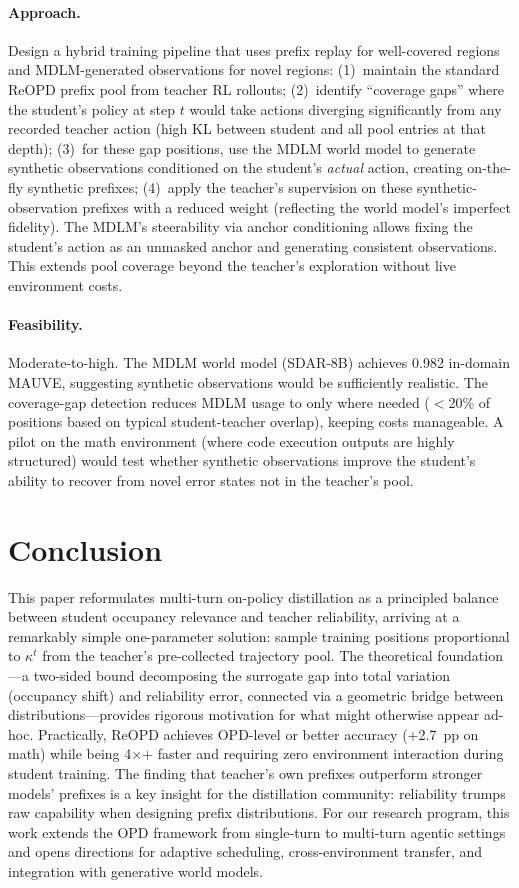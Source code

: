 \documentclass[11pt,a4paper]{article}
\begin{document}
\paragraph{Approach.}
Design a hybrid training pipeline that uses prefix replay for well-covered regions and MDLM-generated observations for novel regions: (1)~maintain the standard ReOPD prefix pool from teacher RL rollouts; (2)~identify ``coverage gaps'' where the student's policy at step $t$ would take actions diverging significantly from any recorded teacher action (high KL between student and all pool entries at that depth); (3)~for these gap positions, use the MDLM world model to generate synthetic observations conditioned on the student's \emph{actual} action, creating on-the-fly synthetic prefixes; (4)~apply the teacher's supervision on these synthetic-observation prefixes with a reduced weight (reflecting the world model's imperfect fidelity). The MDLM's steerability via anchor conditioning allows fixing the student's action as an unmasked anchor and generating consistent observations. This extends pool coverage beyond the teacher's exploration without live environment costs.

\paragraph{Feasibility.}
Moderate-to-high. The MDLM world model (SDAR-8B) achieves 0.982 in-domain MAUVE, suggesting synthetic observations would be sufficiently realistic. The coverage-gap detection reduces MDLM usage to only where needed ($<$20\% of positions based on typical student-teacher overlap), keeping costs manageable. A pilot on the math environment (where code execution outputs are highly structured) would test whether synthetic observations improve the student's ability to recover from novel error states not in the teacher's pool.

\section{Conclusion}

This paper reformulates multi-turn on-policy distillation as a principled balance between student occupancy relevance and teacher reliability, arriving at a remarkably simple one-parameter solution: sample training positions proportional to $\kappa^t$ from the teacher's pre-collected trajectory pool. The theoretical foundation---a two-sided bound decomposing the surrogate gap into total variation (occupancy shift) and reliability error, connected via a geometric bridge between distributions---provides rigorous motivation for what might otherwise appear ad-hoc. Practically, ReOPD achieves OPD-level or better accuracy (+2.7~pp on math) while being 4$\times$+ faster and requiring zero environment interaction during student training. The finding that teacher's own prefixes outperform stronger models' prefixes is a key insight for the distillation community: reliability trumps raw capability when designing prefix distributions. For our research program, this work extends the OPD framework from single-turn to multi-turn agentic settings and opens directions for adaptive scheduling, cross-environment transfer, and integration with generative world models.
\end{document}
